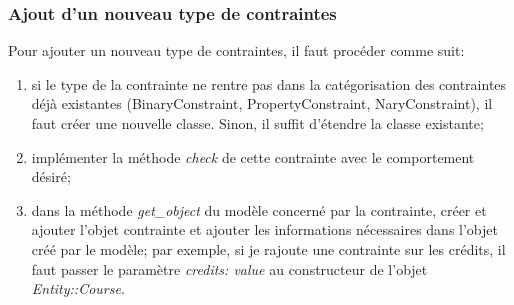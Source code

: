 

\subsubsection{Ajout d'un nouveau type de contraintes}

Pour ajouter un nouveau type de contraintes, il faut procéder comme suit:

\begin{enumerate}
  \item si le type de la contrainte ne rentre pas dans la catégorisation des contraintes déjà existantes (BinaryConstraint, PropertyConstraint, NaryConstraint), il faut créer une nouvelle classe. Sinon, il suffit d'étendre la classe existante;
  \item implémenter la méthode \textit{check} de cette contrainte avec le comportement désiré;
  \item dans la méthode \textit{get\_object} du modèle concerné par la contrainte, créer et ajouter l'objet contrainte et ajouter les informations nécessaires dans l'objet créé par le modèle; par exemple, si je rajoute une contrainte sur les crédits, il faut passer le paramètre \textit{credits: value} au constructeur de l'objet \textit{Entity::Course}.
\end{enumerate}




